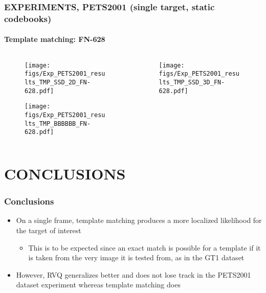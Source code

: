 \begin{frame}
\frametitle{\small EXPERIMENTS, PETS2001 (single target, static codebooks)}
\framesubtitle{Template matching: FN-628}
	\begin{changemargin}{-1.35in}{0in}
	\begin{columns}
		\begin{column}{1.5in}			
			\begin{figure}
				\texttt{[image: figs/Exp\_PETS2001\_results\_TMP\_SSD\_2D\_FN-628.pdf]}
			\end{figure}
			\begin{figure}
				\texttt{[image: figs/Exp\_PETS2001\_results\_TMP\_BBBBBB\_FN-628.pdf]}
			\end{figure}
		\end{column}
		\begin{column}{1.5in}
			\begin{figure}
				\texttt{[image: figs/Exp\_PETS2001\_results\_TMP\_SSD\_3D\_FN-628.pdf]}
			\end{figure}
		\end{column}
	\end{columns}
	\end{changemargin}
\end{frame}






\section{CONCLUSIONS}

\begin{frame}
\frametitle{Conclusions}
\mypagenum
	\begin{itemize}
		\item On a single frame, template matching produces a more localized likelihood for the target of interest
			\begin{itemize}
				\item This is to be expected since an exact match is possible for a template if it is taken from the very image it is tested from, as in the GT1 dataset
			\end{itemize}
		\item However, RVQ generalizes better and does not lose track in the PETS2001 dataset experiment whereas template matching does
	\end{itemize}
\end{frame}

